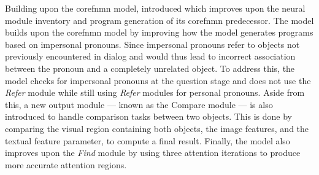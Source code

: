 Building upon the \gls{corefnmn} model, \citeauthor{cho_visual_2021} introduced \cite{cho_visual_2021} which improves upon the neural module inventory and program generation of its \gls{corefnmn} predecessor.
The model builds upon the \gls{corefnmn} model by improving how the model generates programs based on impersonal pronouns.
Since impersonal pronouns refer to objects not previously encountered in dialog and would thus lead to incorrect association between the pronoun and a completely unrelated object.
To address this, the model checks for impersonal pronouns at the question stage and does not use the \textit{Refer} module while still using \textit{Refer} modules for personal pronouns.
Aside from this, a new output module --- known as the Compare module --- is also introduced to handle comparison tasks between two objects.
This is done by comparing the visual region containing both objects, the image features, and the textual feature parameter, to compute a final result.
Finally, the model also improves upon the \textit{Find} module by using three attention iterations to produce more accurate attention regions.
